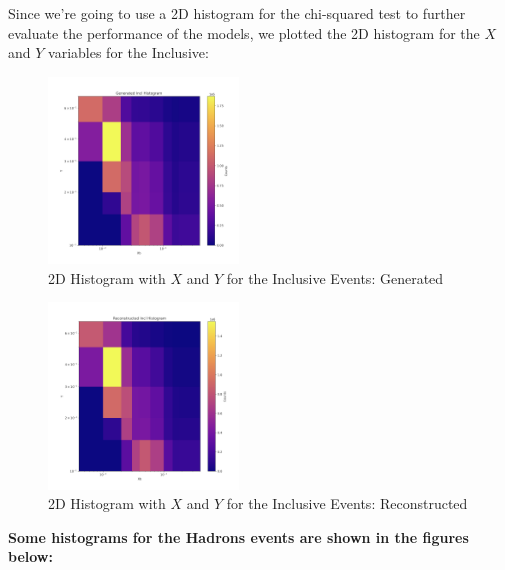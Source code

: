 \documentclass[EPJ,twocolumn]{webofc}
\begin{document}
Since we're going to use a 2D histogram for the chi-squared test to further evaluate the performance of the models, we plotted the 2D histogram for the $X$ and $Y$ variables for the Inclusive:

\begin{figure}[H]
    \centering
    \includegraphics[width=0.45\textwidth]{graphs/incl_xb_y_gen.png}
    \caption{2D Histogram with $X$ and $Y$ for the Inclusive Events: Generated}
    \label{fig:inclusive_2D_histogram_gen}
\end{figure}

\begin{figure}[H]
    \centering
    \includegraphics[width=0.45\textwidth]{graphs/incl_xb_y_rec.png}
    \caption{2D Histogram with $X$ and $Y$ for the Inclusive Events: Reconstructed}
    \label{fig:inclusive_2D_histogram_rec}
\end{figure}

\textbf{Some histograms for the Hadrons events are shown in the figures below:}
\end{document}
